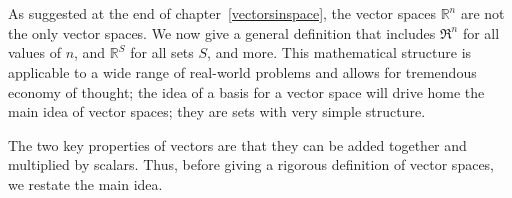 \chapter{\vectorSpacesTitle}
\label{vectorSpaces}

As suggested at the end of chapter~\ref{vectorsinspace}, the vector spaces $\mathbb{R}^n$ are not the only vector spaces. 
We now give a general definition that  includes $\Re^n$ for all values of $n$, and $\mathbb{R}^{S}$ for all sets $S$, and more.
This mathematical structure
is applicable to a wide range of real-world problems and allows for tremendous economy of thought; the idea of a basis for a vector space will drive home the main idea of vector spaces; they are sets with very simple structure. 


The two key properties of vectors are that they can be added together and multiplied by scalars. 
Thus, before giving a rigorous definition of vector spaces, we restate the main idea.\\

\begin{center} 
\end{center}



